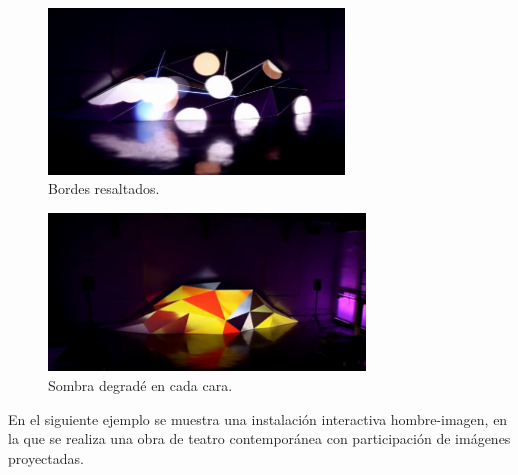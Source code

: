 \begin{minipage}{0.50\textwidth}
\begin{flushleft} \large
\begin{figure}[H]
  \centering
    \includegraphics[width=0.7\textwidth]{./Cap1_intro/Instalacion5.png}
  \caption[http://www.weltlighting.com/fragment/]{Bordes resaltados.}
  \label{fig:Instalacion1}
\end{figure}
\end{flushleft}
\end{minipage}
\begin{minipage}{0.50\textwidth}
\begin{flushright} \large
\begin{figure}[H]
  \centering
    \includegraphics[width=0.75\textwidth]{./Cap1_intro/Instalacion3.png}
  \caption[http://www.weltlighting.com/fragment/]{Sombra degradé en cada cara.}
  \label{fig:Instalacion2}
\end{figure}
\end{flushright}
\end{minipage}

En el siguiente ejemplo se muestra una instalación interactiva hombre-imagen, en la que se realiza una obra de teatro contemporánea con participación de imágenes proyectadas.

